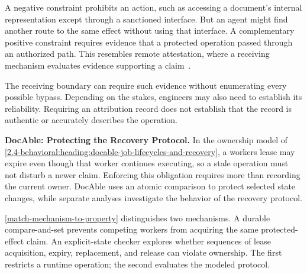 

A negative constraint prohibits an action, such as accessing a document's internal representation except through a sanctioned interface. But an agent might find another route to the same effect without using that interface. A complementary positive constraint requires evidence that a protected operation passed through an authorized path. This resembles remote attestation, where a receiving mechanism evaluates evidence supporting a claim~\citep{birkholz2023rats}.

The receiving boundary can require such evidence without enumerating every possible bypass. Depending on the stakes, engineers may also need to establish its reliability. Requiring an attribution record does not establish that the record is authentic or accurately describes the operation.

\textbf{DocAble: Protecting the Recovery Protocol.} In the ownership model of \autoref{2.4-behavioral:heading:docable-job-lifecycles-and-recovery}, a worker\textquotesingle s lease may expire even though that worker continues executing, so a stale operation must not disturb a newer claim. Enforcing this obligation requires more than recording the current owner. DocAble uses an atomic comparison to protect selected state changes, while separate analyses investigate the behavior of the recovery protocol.


\autoref{match-mechanism-to-property} distinguishes two mechanisms. A durable compare-and-set prevents competing workers from acquiring the same protected-effect claim. An explicit-state checker explores whether sequences of lease acquisition, expiry, replacement, and release can violate ownership. The first restricts a runtime operation; the second evaluates the modeled protocol.

